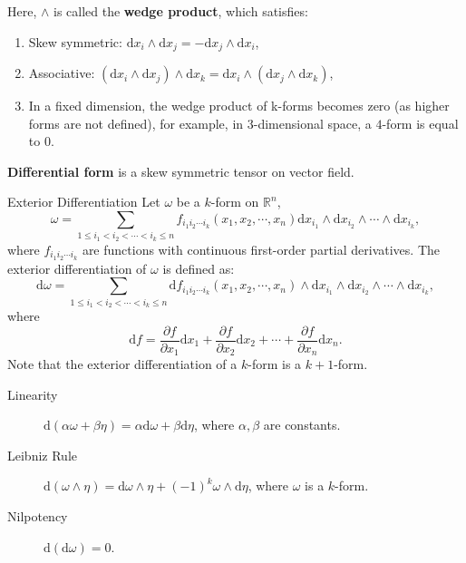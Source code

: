 \documentclass[11pt]{../../TexTemplate/elegantbook}
\begin{document}
Here, \(\wedge\) is called the \textbf{wedge product}, which satisfies:
\begin{enumerate}
    \item Skew symmetric: \(\mathrm{d}x_{i} \wedge \mathrm{d}x_{j} = -\mathrm{d}x_{j} \wedge \mathrm{d}x_{i}\), 
    \item Associative: \((\mathrm{d}x_{i} \wedge \mathrm{d}x_{j}) \wedge \mathrm{d}x_{k} = \mathrm{d}x_{i} \wedge (\mathrm{d}x_{j} \wedge \mathrm{d}x_{k})\),
    \item In a fixed dimension, the wedge product of k-forms becomes zero (as higher forms are not defined), 
        for example, in \(3\)-dimensional space, a \(4\)-form is equal to \(0\).
\end{enumerate}
\textbf{Differential form} is a skew symmetric tensor on vector field.


\begin{definition}{Exterior Differentiation}
    Let \(\omega\) be a \(k\)-form on \(\mathbb{R}^{n}\),
    \[
    \omega = \sum_{1 \leqslant i_{1} < i_{2} < \cdots < i_{k} \leqslant n}
        f_{i_{1} i_{2} \cdots i_{k}}(x_{1}, x_{2}, \cdots, x_{n})
        \mathrm{d}x_{i_{1}} \wedge \mathrm{d}x_{i_{2}} \wedge \cdots \wedge \mathrm{d}x_{i_{k}},
    \]
    where \(f_{i_{1} i_{2} \cdots i_{k}}\) are functions with continuous first-order partial derivatives.
    The exterior differentiation of \(\omega\) is defined as:
    \[
    \mathrm{d}\omega = \sum_{1 \leqslant i_{1} < i_{2} < \cdots < i_{k} \leqslant n}
        \mathrm{d}f_{i_{1} i_{2} \cdots i_{k}}(x_{1}, x_{2}, \cdots, x_{n})
        \wedge \mathrm{d}x_{i_{1}} \wedge \mathrm{d}x_{i_{2}} \wedge \cdots \wedge \mathrm{d}x_{i_{k}},
    \]
    where
    \[
    \mathrm{d}f = \frac{\partial f}{\partial x_1}\mathrm{d}x_1 + 
    \frac{\partial f}{\partial x_2}\mathrm{d}x_2 + 
    \cdots + 
    \frac{\partial f}{\partial x_n}\mathrm{d}x_n.
    \]
    Note that the exterior differentiation of a \(k\)-form is a \(k+1\)-form.
\end{definition}
\begin{property}
    \begin{description}
        \item[Linearity] \(\mathrm{d}(\alpha \omega+ \beta \eta) = \alpha \mathrm{d}\omega + \beta \mathrm{d}\eta\),
        where \(\alpha, \beta\) are constants.
        \item[Leibniz Rule] \(\mathrm{d}(\omega \wedge \eta) = \mathrm{d}\omega \wedge \eta + (-1)^{k} \omega \wedge \mathrm{d}\eta\),
        where \(\omega\) is a \(k\)-form.
        \item[Nilpotency] \(\mathrm{d}(\mathrm{d}\omega) = 0\).
    \end{description}
\end{property}
\end{document}
